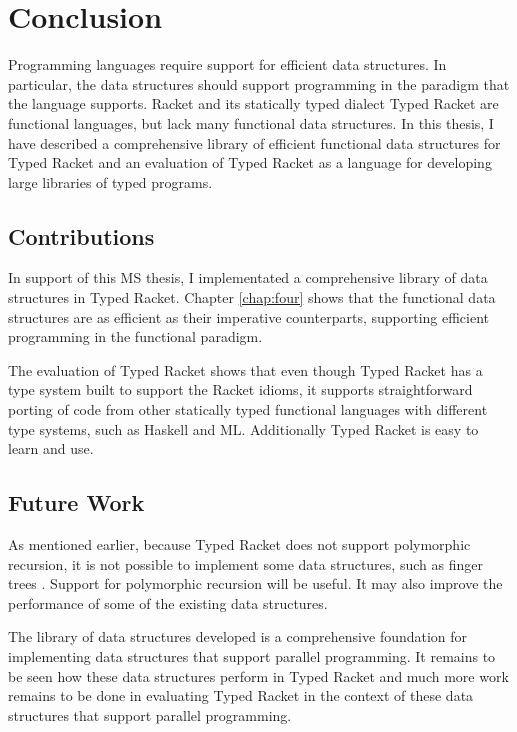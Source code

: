 \chapter{Conclusion}
\label{chap:conclusion}
Programming languages require support for efficient data structures. In
particular, the data structures should support programming in the
paradigm that the language supports. Racket and its statically typed
dialect Typed Racket are functional languages, but lack many functional
data structures. In this thesis, I have described a comprehensive
library of efficient functional data structures for Typed Racket and an
evaluation of Typed Racket as a language for developing large libraries
of typed programs.

\section{Contributions}
In support of this MS thesis, I implementated a comprehensive library of
data structures in Typed Racket. Chapter \ref{chap:four} shows that the
functional data structures are as efficient as their imperative
counterparts, supporting efficient programming in the functional
paradigm.

The evaluation of Typed Racket shows that even though Typed Racket has a
type system built to support the Racket idioms, it supports
straightforward porting of code from other statically typed functional
languages with different type systems, such as Haskell and
ML. Additionally Typed Racket is easy to learn and use.

\section{Future Work}
As mentioned earlier, because Typed Racket does not support polymorphic
recursion, it is not possible to implement some data structures, such as
finger trees \citep{finger}. Support for polymorphic recursion will be
useful. It may also improve the performance of some of the existing data
structures.

The library of data structures developed is a comprehensive foundation
for implementing data structures that support parallel programming. It
remains to be seen how these data structures perform in Typed Racket and
much more work remains to be done in evaluating Typed Racket in the
context of these data structures that support parallel programming.

